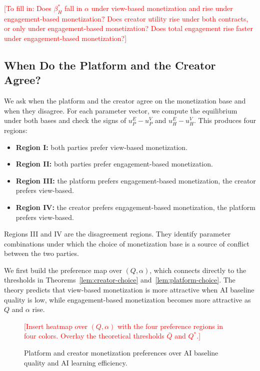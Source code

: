 \textcolor{red}{[To fill in: Does $\beta_H^*$ fall in $\alpha$ under
view-based monetization and rise under engagement-based monetization?
Does creator utility rise under both contracts, or only under
engagement-based monetization? Does total engagement rise faster under
engagement-based monetization?]}



\subsection{When Do the Platform and the Creator Agree?}
\label{subsec:numerics-regions}

We ask when the platform and the creator agree on the
monetization base and when they disagree. For each parameter vector,
we compute the equilibrium under both bases and check the signs of
$u_P^E-u_P^V$ and $u_H^E-u_H^V$. This produces four regions:

\begin{itemize}
    \item \textbf{Region I:} both parties prefer view-based monetization.
    \item \textbf{Region II:} both parties prefer engagement-based monetization.
    \item \textbf{Region III:} the platform prefers engagement-based monetization, the creator prefers view-based.
    \item \textbf{Region IV:} the creator prefers engagement-based monetization, the platform prefers view-based.
\end{itemize}

Regions III and IV are the disagreement regions. They identify
parameter combinations under which the choice of monetization base is
a source of conflict between the two parties.

We first build the preference map over $(Q,\alpha)$, which connects
directly to the thresholds in Theorems~\ref{lem:creator-choice}
and~\ref{lem:platform-choice}. The theory predicts that view-based
monetization is more attractive when AI baseline quality is low,
while engagement-based monetization becomes more attractive as $Q$ and
$\alpha$ rise.

\begin{figure}[ht]
\centering
\textcolor{red}{[Insert heatmap over $(Q,\alpha)$ with the four
preference regions in four colors. Overlay the theoretical thresholds
$\bar Q$ and $Q^*$.]}
\caption{Platform and creator monetization preferences over AI
baseline quality and AI learning efficiency.}
\label{fig:preference-map-Q-alpha}
\end{figure}

